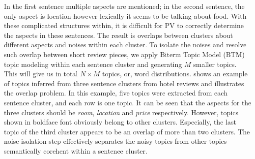 In the first sentence multiple aspects are mentioned; in the second sentence, the only aspect is location however lexically it seems to be talking about food.
With these complicated structures within, 
it is difficult for  PV to correctly determine the aspects 
in these sentences. The result is overlaps between clusters about 
different aspects and noises within each cluster.
To isolate the noises and resolve such overlap between short review pieces, 
we apply Biterm Topic Model (BTM) \cite{cheng2014btm} topic modeling within each sentence cluster 
and generating $M$ smaller topics. 
This will give us in total $N\times M$ topics, or, word distributions. 
 shows an example of topics inferred from three
sentence clusters from hotel reviews and illustrates the overlap problem.
In this example, five topics were extracted from each sentence cluster, 
and each row is one topic. It can be seen that the aspects for the 
three clusters should be {\em room}, {\em location} and {\em price} 
respectively.
However, topics shown in boldface font obviously belong to 
other clusters.  Especially, the last topic of the third cluster 
appears to be an overlap of more than two clusters.
The noise isolation step effectively separates the noisy topics from other
topics semantically corehent within a sentence cluster.

